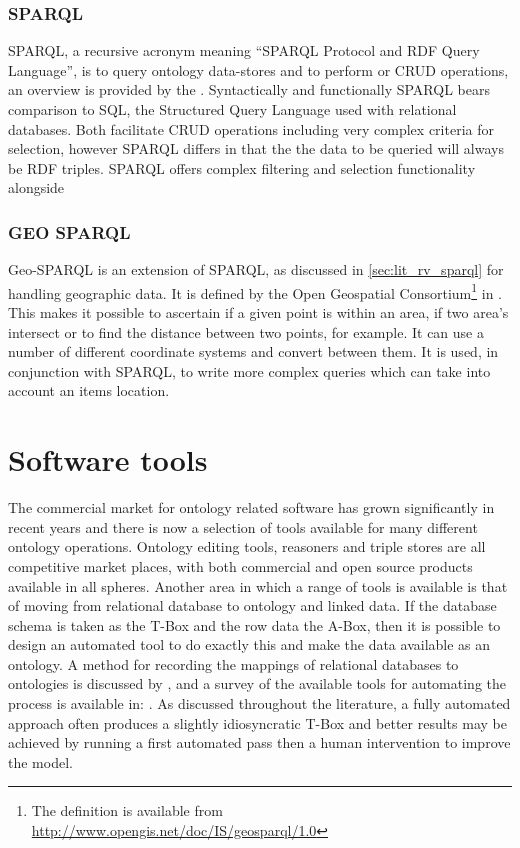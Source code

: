 \subsubsection{SPARQL}
\label{sec:lit_rv_sparql}
SPARQL, a recursive acronym meaning ``SPARQL Protocol and RDF Query Language'', is to query ontology data-stores and to perform   or CRUD operations, an overview is provided by the \citet{5403219}. Syntactically and functionally SPARQL bears comparison to SQL, the Structured Query Language used with relational databases. Both facilitate CRUD operations including very complex criteria for selection, however SPARQL differs in that the the data to be queried will always be RDF triples. SPARQL offers complex filtering and selection functionality alongside 

\subsubsection{GEO SPARQL}
Geo-SPARQL is an extension of SPARQL, as discussed in \autoref{sec:lit_rv_sparql} for handling geographic data. It is defined by the Open Geospatial Consortium\footnote{The definition is available from \url{http://www.opengis.net/doc/IS/geosparql/1.0}} in \citet{Perry2012}. This makes it possible to ascertain if a given point is within an area, if two area's intersect or to find the distance between two points, for example. It can use a number of different coordinate systems and convert between them. It is used, in conjunction with SPARQL, to write more complex queries which can take into account an items location.

\section{Software tools}
The commercial market for ontology related software has grown significantly in recent years and there is now a selection of tools available for many different ontology operations. Ontology editing tools, reasoners and triple stores are all competitive market places, with both commercial and open source products available in all spheres. Another area in which a range of tools is available is that of moving from relational database to ontology and linked data. If the database schema is taken as the T-Box and the row data the A-Box, then it is possible to design an automated tool to do exactly this and make the data available as an ontology. A method for recording the mappings of relational databases to ontologies is discussed by \citet{Dimou2014}, and a survey of the available tools for automating the process is available in: \citep{Spanos2012}. As discussed throughout the literature, a fully automated approach often produces a slightly idiosyncratic T-Box and better results may be achieved by running a first automated pass then a human intervention to improve the model.

